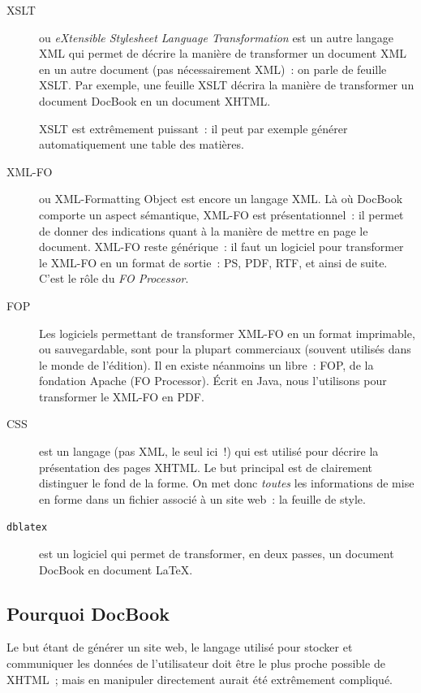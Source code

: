 \documentclass[final,11pt,a4paper,twoside,titlepage]{article}
\newcommand{\p}{\vspace{0.3em}}
\begin{document}
{\begin{description}
        \item[XSLT] ou \emph{eXtensible Stylesheet Language Transformation} est
          un autre langage XML qui permet de décrire la manière de transformer
          un document XML en un autre document (pas nécessairement XML)~: on
          parle de feuille XSLT. Par exemple, une feuille XSLT décrira la
          manière de transformer un document DocBook en un document XHTML.

          XSLT est extrêmement puissant~: il peut par exemple générer
          automatiquement une table des matières. \p

        \item[XML-FO] ou XML-Formatting Object est encore un langage XML. Là où
          DocBook comporte un aspect sémantique, XML-FO est présentationnel~: il
          permet de donner des indications quant à la manière de mettre en page
          le document. XML-FO reste générique~: il faut un logiciel pour
          transformer le XML-FO en un format de sortie~: PS, PDF, RTF, et ainsi
          de suite. C'est le rôle du \emph{FO Processor}. \p

        \item[FOP] Les logiciels permettant de transformer XML-FO en un format
          imprimable, ou sauvegardable, sont pour la plupart commerciaux
          (souvent utilisés dans le monde de l'édition). Il en existe néanmoins
          un libre~: FOP, de la fondation Apache (FO Processor). Écrit en Java,
          nous l'utilisons pour transformer le XML-FO en PDF. \p

        \item[CSS] est un langage (pas XML, le seul ici~!) qui est utilisé
          pour décrire la présentation des pages XHTML. Le but principal est
          de clairement distinguer le fond de la forme. On met donc \emph{toutes}
          les informations de mise en forme dans un fichier associé à un site
          web~: la feuille de style. \p

        \item[\texttt{dblatex}] est un logiciel qui permet de transformer, en
          deux passes, un document DocBook en document \LaTeX{}. 
      \end{description}

    \subsection{Pourquoi DocBook}
      Le but étant de générer un site web, le langage utilisé pour stocker et
      communiquer les données de l'utilisateur doit être le plus proche possible
      de XHTML~; mais en manipuler directement aurait été extrêmement compliqué.
      \p

}
\end{document}
